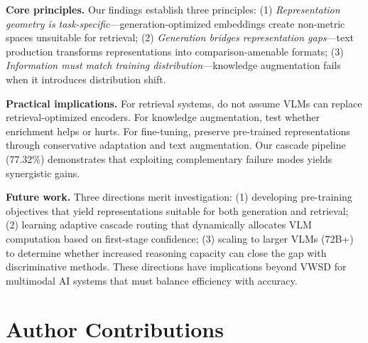 \documentclass[11pt]{article}
\begin{document}
\textbf{Core principles.} Our findings establish three principles: (1) \textit{Representation geometry is task-specific}---generation-optimized embeddings create non-metric spaces unsuitable for retrieval; (2) \textit{Generation bridges representation gaps}---text production transforms representations into comparison-amenable formats; (3) \textit{Information must match training distribution}---knowledge augmentation fails when it introduces distribution shift.

\textbf{Practical implications.} For retrieval systems, do not assume VLMs can replace retrieval-optimized encoders. For knowledge augmentation, test whether enrichment helps or hurts. For fine-tuning, preserve pre-trained representations through conservative adaptation and text augmentation. Our cascade pipeline (77.32\%) demonstrates that exploiting complementary failure modes yields synergistic gains.

\textbf{Future work.} Three directions merit investigation: (1) developing pre-training objectives that yield representations suitable for both generation and retrieval; (2) learning adaptive cascade routing that dynamically allocates VLM computation based on first-stage confidence; (3) scaling to larger VLMs (72B+) to determine whether increased reasoning capacity can close the gap with discriminative methods. These directions have implications beyond VWSD for multimodal AI systems that must balance efficiency with accuracy.

\section*{Author Contributions}
\end{document}
